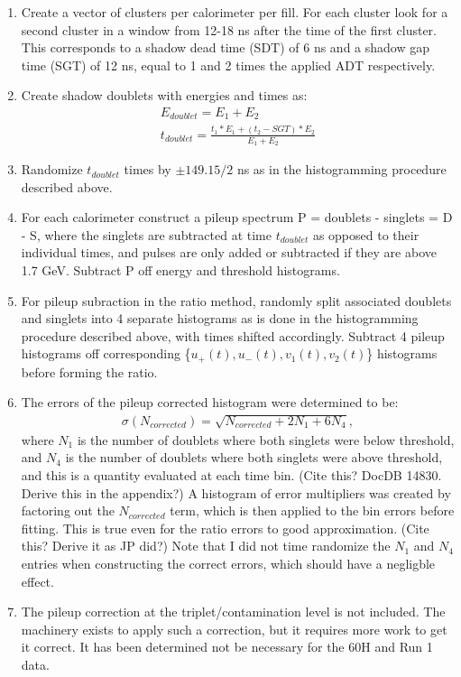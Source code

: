 \begin{enumerate}
	\item{Create a vector of clusters per calorimeter per fill. For each cluster look for a second cluster in a window from 12-18 ns after the time of the first cluster. This corresponds to a shadow dead time (SDT) of 6 ns and a shadow gap time (SGT) of 12 ns, equal to 1 and 2 times the applied ADT respectively.}
	\item{Create shadow doublets with energies and times as:
		\begin{gather*}
			E_{doublet} = E_{1} + E_{2} \\
			t_{doublet} = \frac{t_{1}*E_{1} + (t_{2}-SGT)*E_{2}}{E_{1} + E_{2}}
		\end{gather*}}
	\item{Randomize $t_{doublet}$ times by $\pm 149.15/2$ ns as in the histogramming procedure described above.}
	\item{For each calorimeter construct a pileup spectrum P = doublets - singlets = D - S, where the singlets are subtracted at time $t_{doublet}$ as opposed to their individual times, and pulses are only added or subtracted if they are above 1.7 GeV. Subtract P off energy and threshold histograms.}
	\item{For pileup subraction in the ratio method, randomly split associated doublets and singlets into 4 separate histograms as is done in the histogramming procedure described above, with times shifted accordingly. Subtract 4 pileup histograms off corresponding \{$u_{+}(t), u_{-}(t), v_{1}(t), v_{2}(t)$\} histograms before forming the ratio.}
	\item{The errors of the pileup corrected histogram were determined to be: 
		\begin{gather*}
			\sigma(N_{corrected}) = \sqrt{N_{corrected} + 2 N_{1} + 6 N_{4}},
		\end{gather*}
	where $N_{1}$ is the number of doublets where both singlets were below threshold, and $N_{4}$ is the number of doublets where both singlets were above threshold, and this is a quantity evaluated at each time bin. (Cite this? DocDB 14830. Derive this in the appendix?) A histogram of error multipliers was created by factoring out the $N_{corrected}$ term, which is then applied to the bin errors before fitting. This is true even for the ratio errors to good approximation. (Cite this? Derive it as JP did?) Note that I did not time randomize the $N_{1}$ and $N_{4}$ entries when constructing the correct errors, which should have a negligble effect.}
	\item{The pileup correction at the triplet/contamination level is not included. The machinery exists to apply such a correction, but it requires more work to get it correct. It has been determined not be necessary for the 60H and Run 1 data.}
\end{enumerate}


